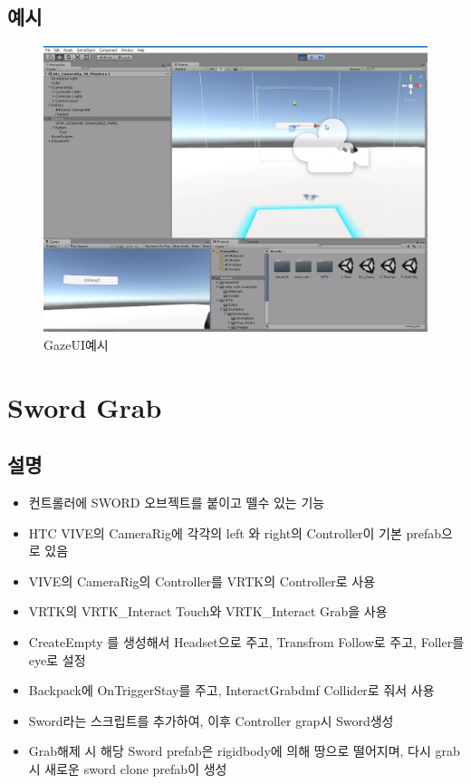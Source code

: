 \documentclass{report}
\begin{document}
    \subsection{예시}
    
    \begin{figure}[h!]
    \centering
    \includegraphics[width=1.0\textwidth]{vrtk4-1.jpg}
    \caption{GazeUI예시}
    \end{figure}
    
 
    
    
    \section{Sword Grab}
    
    \subsection{설명}
    
    \begin{itemize}

    \item 컨트롤러에 SWORD 오브젝트를 붙이고 뗄수 있는 기능
    \item HTC VIVE의 CameraRig에 각각의 left 와 right의 Controller이 기본 prefab으로 있음
    \item VIVE의 CameraRig의 Controller를 VRTK의 Controller로 사용
    \item VRTK의 VRTK_Interact Touch와 VRTK_Interact Grab을 사용
    \item CreateEmpty 를 생성해서 Headset으로 주고, Transfrom Follow로 주고, Foller를 eye로 설정
    \item Backpack에 OnTriggerStay를 주고, InteractGrabdmf Collider로 줘서 사용
    \item Sword라는 스크립트를 추가하여, 이후 Controller grap시 Sword생성
    \item Grab해제 시 해당 Sword prefab은 rigidbody에 의해 땅으로 떨어지며, 다시 grab시 새로운 sword clone prefab이 생성

    \end{itemize}
    
\end{document}

